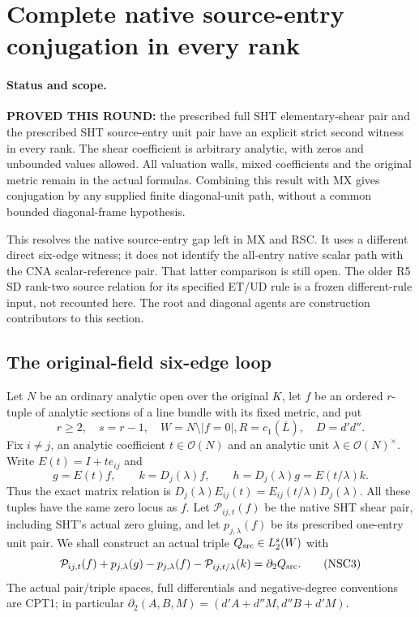 \section{Complete native source-entry conjugation in every rank}
\label{sec:r10-native-source-diagonal-shear-conjugation}

\paragraph{Status and scope.}
\textbf{PROVED THIS ROUND:} the prescribed full SHT elementary-shear
pair and the prescribed SHT source-entry unit pair have an explicit
strict second witness in every rank.  The shear coefficient is
arbitrary analytic, with zeros and unbounded values allowed.  All
valuation walls, mixed coefficients and the original metric remain
in the actual formulas.  Combining this result with MX gives
conjugation by any supplied finite diagonal-unit path, without a
common bounded diagonal-frame hypothesis.

This resolves the native source-entry gap left in MX and RSC.
It uses a different direct six-edge witness; it does not identify
the all-entry native scalar path with the CNA scalar-reference
pair.  That latter comparison is still open.  The older R5 SD
rank-two source relation for its specified ET/UD rule is a frozen
different-rule input, not recounted here.  The root and diagonal
agents are construction contributors to this section.

\subsection{The original-field six-edge loop}

Let $N$ be an ordinary analytic open over the original $K$, let
$f$ be an ordered $r$-tuple of analytic sections of a line bundle
with its fixed metric, and put
\[
        r\geq2,\quad s=r-1,\quad W=N\setminus|f=0|,
                 R=c_1(\overline L),\quad D=d'd''.
 \tag{NSC1}
\]
Fix $i\ne j$, an analytic coefficient $t\in\mathcal O(N)$ and
an analytic unit $\lambda\in\mathcal O(N)^\times$.
Write $E(t)=I+t e_{ij}$ and
\[
       g=E(t)f,\qquad k=D_j(\lambda)f,\qquad
       h=D_j(\lambda)g=E(t/\lambda)k .
 \tag{NSC2}
\]
Thus the exact matrix relation is
$D_j(\lambda)E_{ij}(t)=E_{ij}(t/\lambda)D_j(\lambda)$.
All these tuples have the same zero locus as $f$.
Let $\mathcal P_{ij,t}(f)$ be the native SHT shear pair,
including SHT's actual zero gluing, and let
$p_{j,\lambda}(f)$ be its prescribed one-entry unit pair.
We shall construct an actual triple $Q_{\rm src}\in L_2^s(W)$
with
\[
 \mathcal P_{ij,t}(f)+p_{j,\lambda}(g)
       -p_{j,\lambda}(f)-\mathcal P_{ij,t/\lambda}(k)
                            =\partial_2Q_{\rm src}.
 \tag{NSC3}
\]
The actual pair/triple spaces, full differentials and negative-degree
conventions are CPT1; in particular
$\partial_2(A,B,M)=(d'A+d''M,d''B+d'M)$.

